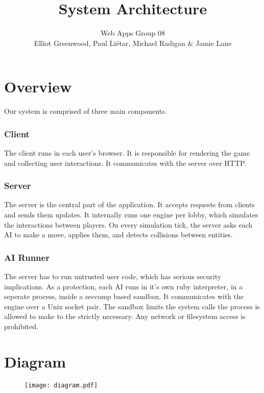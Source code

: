 \documentclass[a4paper]{article}
\title{System Architecture}
\author{Web Apps Group 08 \\ Elliot Greenwood, Paul Li\'etar, Michael Radigan \& Jamie Lane}
\date{}
\begin{document}
\maketitle

\section*{Overview}
Our system is comprised of three main components.

\subsubsection*{Client}
The client runs in each user's browser. It is responsible for rendering the game and collecting user interactions.
It communicates with the server over HTTP.

\subsubsection*{Server}
The server is the central part of the application. It accepts requests from clients and sends them updates.
It internally runs one engine per lobby, which simulates the interactions between players.
On every simulation tick, the server asks each AI to make a move, applies them, and detects collisions between entities.

\subsubsection*{AI Runner}
The server has to run untrusted user code, which has serious security implications.
As a protection, each AI runs in it's own ruby interpreter, in a seperate process, inside a seccomp based sandbox.
It communicates with the engine over a Unix socket pair.
The sandbox limits the system calls the process is allowed to make to the strictly necessary.
Any network or filesystem access is prohibited.

\section*{Diagram}
\begin{figure}[h]
\centering
\texttt{[image: diagram.pdf]}
\end{figure}
\end{document}
